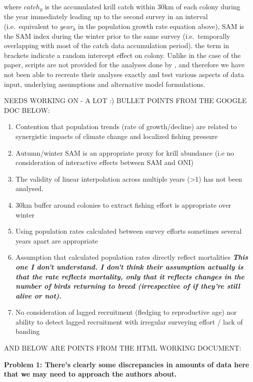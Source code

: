 \documentclass[]{elsarticle} %
\providecommand{\tightlist}{%
  \setlength{\itemsep}{0pt}\setlength{\parskip}{0pt}}
\begin{document}
where \(catch_y\) is the accumulated krill catch within 30km of each
colony during the year immediately leading up to the second survey in an
interval (i.e.~equivalent to \(year_b\) in the population growth rate
equation above), SAM is the SAM index during the winter prior to the
same survey (i.e.~temporally overlapping with most of the catch data
accumulation period). the term in brackets indicate a random intercept
effect on colony. Unlike in the case of the \citet{Watters2020} paper,
scripts are not provided for the analyses done by \citet{Kruger2021},
and therefore we have not been able to recreate their analyses exactly
and test various aspects of data input, underlying assumptions and
alternative model formulations.

NEEDS WORKING ON - A LOT :) BULLET POINTS FROM THE GOOGLE DOC BELOW:

\begin{enumerate}
\def\labelenumi{\arabic{enumi}.}
\tightlist
\item
  Contention that population trends (rate of growth/decline) are related
  to synergistic impacts of climate change and localized fishing
  pressure
\item
  Autumn/winter SAM is an appropriate proxy for krill abundance (i.e no
  consideration of interactive effects between SAM and ONI)
\item
  The validity of linear interpolation across multiple years
  (\textgreater1) has not been analysed.
\item
  30km buffer around colonies to extract fishing effort is appropriate
  over winter
\item
  Using population rates calculated between survey efforts sometimes
  several years apart are appropriate
\item
  Assumption that calculated population rates directly reflect
  mortalities \textbf{\emph{This one I don't understand. I don't think
  their assumption actually is that the rate reflects mortality, only
  that it reflects changes in the number of birds returning to breed
  (irrespective of if they're still alive or not).}}
\item
  No consideration of lagged recruitment (fledging to reproductive age)
  nor ability to detect lagged recruitment with irregular surveying
  effort / lack of banding
\end{enumerate}

AND BELOW ARE POINTS FROM THE HTML WORKING DOCUMENT:

\textbf{Problem 1: There's clearly some discrepancies in amounts of data
here that we may need to approach the authors about.}
\end{document}
